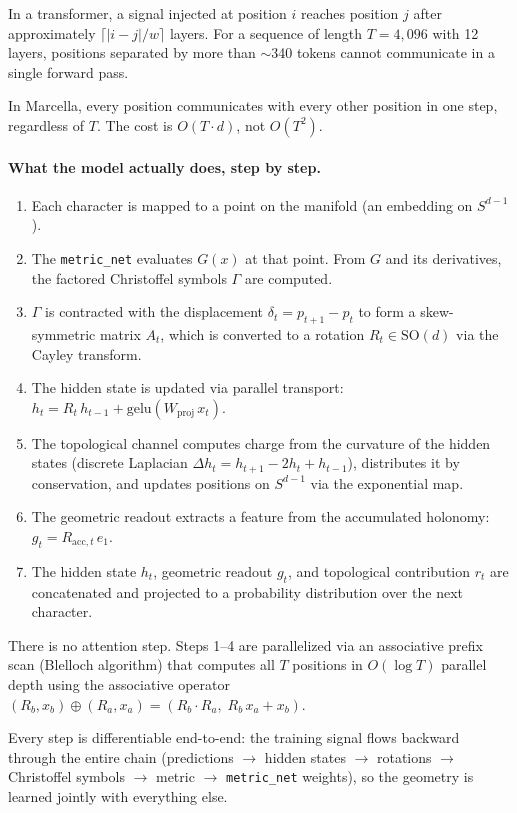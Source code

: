 \documentclass[11pt,a4paper]{article}
\theoremstyle{definition}
\theoremstyle{remark}
\begin{document}
In a transformer, a signal injected at position $i$ reaches position $j$ after approximately $\lceil|i-j|/w\rceil$ layers. For a sequence of length $T = 4{,}096$ with 12 layers, positions separated by more than $\sim$340 tokens cannot communicate in a single forward pass.

In Marcella, every position communicates with every other position in one step, regardless of $T$. The cost is $O(T \cdot d)$, not $O(T^2)$.

\paragraph{What the model actually does, step by step.}
\begin{enumerate}
    \item Each character is mapped to a point on the manifold (an embedding on $S^{d-1}$).
    \item The \texttt{metric\_net} evaluates $G(x)$ at that point. From $G$ and its derivatives, the factored Christoffel symbols $\Gamma$ are computed.
    \item $\Gamma$ is contracted with the displacement $\delta_t = p_{t+1} - p_t$ to form a skew-symmetric matrix $A_t$, which is converted to a rotation $R_t \in \mathrm{SO}(d)$ via the Cayley transform.
    \item The hidden state is updated via parallel transport: $h_t = R_t\,h_{t-1} + \mathrm{gelu}(W_{\mathrm{proj}}\,x_t)$.
    \item The topological channel computes charge from the curvature of the hidden states (discrete Laplacian $\Delta h_t = h_{t+1} - 2h_t + h_{t-1}$), distributes it by conservation, and updates positions on $S^{d-1}$ via the exponential map.
    \item The geometric readout extracts a feature from the accumulated holonomy: $g_t = R_{\mathrm{acc},t}\,e_1$.
    \item The hidden state $h_t$, geometric readout $g_t$, and topological contribution $r_t$ are concatenated and projected to a probability distribution over the next character.
\end{enumerate}
There is no attention step. Steps 1--4 are parallelized via an associative prefix scan (Blelloch algorithm) that computes all $T$ positions in $O(\log T)$ parallel depth using the associative operator $(R_b, x_b) \oplus (R_a, x_a) = (R_b \cdot R_a,\; R_b\,x_a + x_b)$.

Every step is differentiable end-to-end: the training signal flows backward through the entire chain (predictions $\to$ hidden states $\to$ rotations $\to$ Christoffel symbols $\to$ metric $\to$ \texttt{metric\_net} weights), so the geometry is learned jointly with everything else.
\end{document}
